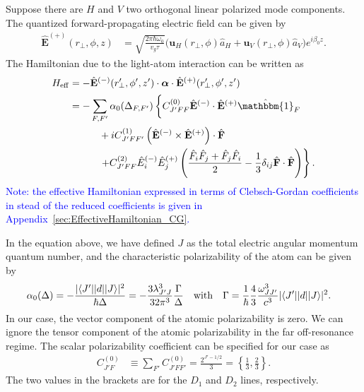 \documentclass[preprint,aps,pra,onecolumn]{revtex4-1} %
\renewcommand{\tensor}[1]{\boldsymbol{#1}}
\begin{document}
Suppose there are $H$ and $V$ two orthogonal linear polarized mode components. The quantized forward-propagating electric field can be given by
\begin{align}
\hat{\mathbf{E}}^{(+)}(r\!_\perp,\phi,z) &= \sqrt{ \frac{2 \pi \hbar \omega_0}{ v_g \tau} } \big( \mathbf{u}_H(r\!_\perp,\phi) \hat{a}_H + \mathbf{u}_V(r\!_\perp,\phi) \hat{a}_V \big) e^{i \beta_0 z}.
\end{align}
The Hamiltonian due to the light-atom interaction can be written as
\begin{align}
H_{\rm eff}   &= -\hat{\mathbf{E}}^{(-)}(r^\prime\!\!_\perp,\phi',z')\cdot \tensor{\alpha}\cdot 
\hat{\mathbf{E}}^{(+)}(r^\prime\!\!_\perp,\phi',z') \label{eq:Heff_0}\\
 &=- \sum_{F,F'}\alpha_0(\Delta_{F,F'}) \left\{ C_{J'FF}^{(0)} \hat{\mathbf{E}}^{(-)} \cdot \hat{\mathbf{E}}^{(+)} \hat{\mathbbm{1}}_F \phantom{\frac{\hat{1}}{1}}\right. \nonumber\\
&\quad\quad\quad + i C_{J'FF'}^{(1)} \left(\hat{\mathbf{E}}^{(-)} \times \hat{\mathbf{E}}^{(+)} \right) \cdot \hat{ \mathbf{F}} \nonumber\\
&\quad\quad\quad  \left. + C_{J'FF}^{(2)} \hat{E}_i^{(-)} \hat{E}_j^{(+)} \left( \frac{ \hat{F}_i \hat{F}_j  + \hat{F}_j \hat{F}_i  }{2} - \frac{1}{3}\delta_{ij} \hat{ \mathbf{F}} \cdot \hat{\mathbf{F}}  \right) \right\}. 
\end{align}
\textcolor{blue}{Note: the effective Hamiltonian expressed in terms of Clebsch-Gordan coefficients in 
stead of the reduced coefficients is given in Appendix~\ref{sec:EffectiveHamiltonian_CG}. }

In the equation above, we have defined $ J $ as the total electric angular momentum quantum number, and the characteristic polarizability of the atom can be given by
\begin{align} \label{Eq::alpha0}
\alpha_0(\Delta) & =  -\frac{|  \langle{ J' }\rvert| d | \lvert{ J }\rangle |^2}{\hbar \Delta } = - \frac{3 \lambda_{J' J}^3}{32 \pi^3} \frac{ \Gamma }{ \Delta }\quad \text{with}\quad 
\Gamma = \frac{1}{\hbar} \frac{4}{3} \frac{\omega_{J J'}^3}{c^3} | \langle{ J' }\rvert| d | \lvert{ J }\rangle |^2.
\end{align}
In our case, the vector component of the atomic polarizability is zero. We can ignore the tensor component of the atomic polarizability in the far off-resonance regime. The scalar polarizability coefficient can be specified for our case as
\begin{align} \label{Eq::alpha0}
C_{J' F}^{(0)} &\equiv \sum_{F'} C_{J' F F'}^{(0)} =   \frac{2^{J'-1/2}}{3} =\left\{ \frac{1}{3},\frac{2}{3}\right\}.
\end{align}
The two values in the brackets are for the $D_1$ and $D_2$ lines, respectively.
\end{document}
